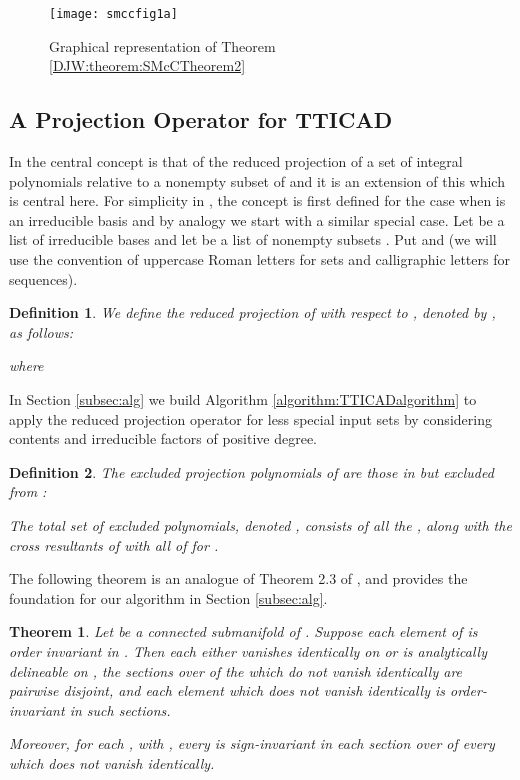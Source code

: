 \documentclass{article}
\newtheorem{definition}{Definition}
\newtheorem{theorem}{Theorem}
\begin{document}
\begin{figure}
\caption{Graphical representation of Theorem \ref{DJW:theorem:SMcCTheorem2}}\label{fig:theorem2}
\begin{center}
\texttt{[image: smccfig1a]}
\end{center}
\vskip-10pt
\end{figure}

\subsection{A Projection Operator for TTICAD}
\label{subsec:ProjOper}

In \cite{McCallum1999a} the central concept is that of the reduced projection
of a set  of integral polynomials relative to a nonempty subset  of  and it is an extension of this which is central here.
For simplicity in \cite{McCallum1999a}, the concept is first defined for the case when  is an irreducible basis and by analogy we start with a similar special case.
Let  be a list of irreducible bases 
and let  be a list of nonempty subsets
. 
Put  and   (we will use the convention of uppercase Roman letters for sets and calligraphic letters for sequences). 
\begin{definition}\label{def:reducedproj}
We define the {\em reduced projection of  with respect to }, denoted by , as follows:

where 

\end{definition}
In Section \ref{subsec:alg} we build Algorithm \ref{algorithm:TTICADalgorithm} to apply the reduced projection operator for less special input sets by considering contents and irreducible factors of positive degree.


\begin{definition}\label{def:excproj}
The {\em excluded projection polynomials} of  
are those in  but excluded from :

The total set of excluded polynomials, denoted , consists of all the , along with the cross resultants of  with all of  for . 
\end{definition}

\noindent The following theorem is an analogue of Theorem 2.3 of \cite{McCallum1999a},
and provides the foundation for our algorithm in Section \ref{subsec:alg}.

\begin{theorem}\label{DJW:theorem:SMcC3corrected}
  Let  be a connected submanifold of . Suppose each element of  is order invariant in . Then each  either vanishes identically on  or is analytically delineable on , the sections over  of the  which do not vanish identically are pairwise disjoint, and each element  which does not vanish identically is order-invariant in such sections.
  
{\em Moreover}, for each , with , every  is sign-invariant in each section over  of every  which does not vanish identically. 
\end{theorem}
\end{document}
